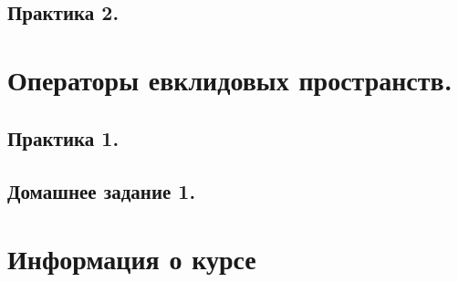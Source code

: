 \subsection{Практика 2.}

\newpage

\section{Операторы евклидовых пространств.}

\subsection{Практика 1.}

\newpage
\subsection{Домашнее задание 1.}

\newpage

\section{Информация о курсе}


